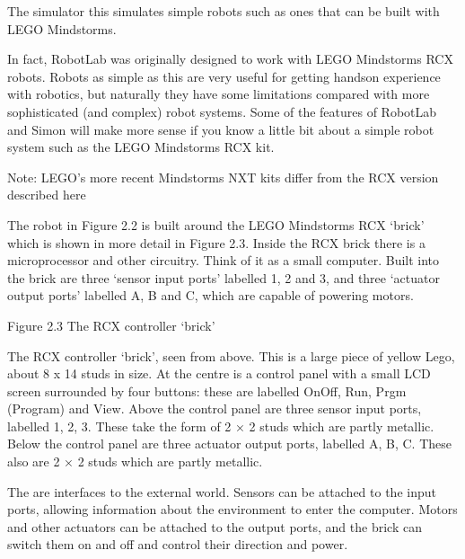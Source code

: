 \documentclass[letterpaper,10pt,english]{sphinxmanual}
\begin{document}
The  simulator this simulates simple robots such as ones that can be built with LEGO Mindstorms.


In fact, RobotLab was originally designed to work with LEGO Mindstorms RCX robots. Robots as simple as this are very useful for getting hands\sphinxhyphen{}on experience with robotics, but naturally they have some limitations compared with more sophisticated (and complex) robot systems. Some of the features of RobotLab and Simon will make more sense if you know a little bit about a simple robot system such as the LEGO Mindstorms RCX kit.





Note: LEGO’s more recent Mindstorms NXT kits differ from the RCX version described here





The robot in Figure 2.2 is built around the LEGO Mindstorms RCX ‘brick’ which is shown in more detail in Figure 2.3. Inside the RCX brick there is a microprocessor and other circuitry. Think of it as a small computer. Built into the brick are three ‘sensor input ports’ labelled 1, 2 and 3, and three ‘actuator output ports’ labelled A, B and C, which are capable of powering motors.

\noindent{}

Figure 2.3 The RCX controller ‘brick’

The RCX controller ‘brick’, seen from above. This is a large piece of yellow Lego, about 8 x 14 studs in size. At the centre is a control panel with a small LCD screen surrounded by four buttons: these are labelled On\sphinxhyphen{}Off, Run, Prgm (Program) and View. Above the control panel are three sensor input ports, labelled 1, 2, 3. These take the form of 2 × 2 studs which are partly metallic. Below the control panel are three actuator output ports, labelled A, B, C. These also are 2 × 2 studs which are
partly metallic.

The  are interfaces to the external world. Sensors can be attached to the input ports, allowing information about the environment to enter the computer. Motors and other actuators can be attached to the output ports, and the brick can switch them on and off and control their direction and power.
\end{document}
